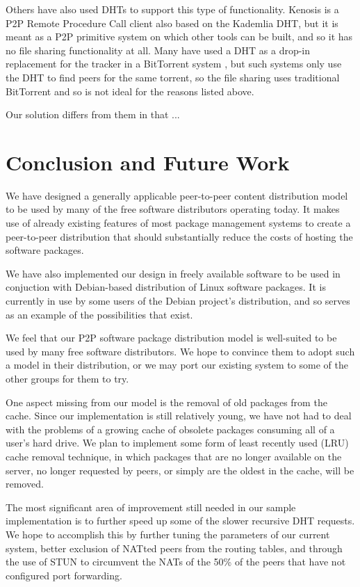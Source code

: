 \documentclass[conference]{IEEEtran}
\begin{document}
Others have also used DHTs to support this type of functionality.
Kenosis \cite{kenosis} is a P2P Remote Procedure Call
client also based on the Kademlia DHT, but it is meant as a P2P
primitive system on which other tools can be built, and so it has no
file sharing functionality at all. Many have used a DHT as a drop-in
replacement for the tracker in a BitTorrent system
\cite{bittorrent-dht, azureus-dht}, but such systems only use the
DHT to find peers for the same torrent, so the file sharing uses
traditional BitTorrent and so is not ideal for the reasons listed
above.

Our solution differs from them in that ...



\section{Conclusion and Future Work}
\label{conclusions}

We have designed a generally applicable peer-to-peer content
distribution model to be used by many of the free software
distributors operating today. It makes use of already existing
features of most package management systems to create a
peer-to-peer distribution that should substantially reduce the costs
of hosting the software packages.

We have also implemented our design in freely available software to
be used in conjuction with Debian-based distribution of Linux
software packages. It is currently in use by some users of the
Debian project's distribution, and so serves as an example of the
possibilities that exist.

We feel that our P2P software package distribution model is
well-suited to be used by many free software distributors. We hope
to convince them to adopt such a model in their distribution, or we
may port our existing system to some of the other groups for them to
try.

One aspect missing from our model is the removal of old packages
from the cache. Since our implementation is still relatively young,
we have not had to deal with the problems of a growing cache of
obsolete packages consuming all of a user's hard drive. We plan to
implement some form of least recently used (LRU) cache removal
technique, in which packages that are no longer available on the
server, no longer requested by peers, or simply are the oldest in
the cache, will be removed.

The most significant area of improvement still needed in our sample
implementation is to further speed up some of the slower recursive
DHT requests. We hope to accomplish this by further tuning the
parameters of our current system, better exclusion of NATted peers
from the routing tables, and through the use of STUN \cite{STUN} to
circumvent the NATs of the 50\% of the peers that have not
configured port forwarding.



\end{document}
